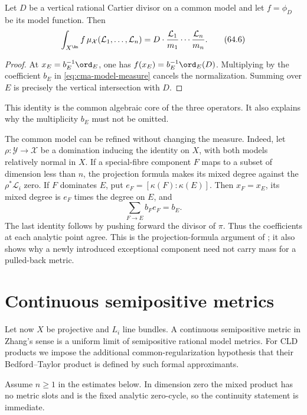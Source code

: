 \begin{proposition}\label{prop:cma-model-test}
Let $D$ be a vertical rational Cartier divisor on a common model and let
$f=\phi_D$ be its model function.
Then
\[
 \int_{X^{\An}}f\,
       \mu_{\mathcal X}(\mathcal L_1,\ldots,\mathcal L_n)
 =D\cdot\frac{\mathcal L_1}{m_1}\cdots
          \frac{\mathcal L_n}{m_n}.
\tag{64.6}\label{eq:cma-model-duality}
\]
\end{proposition}

\begin{proof}
At $x_E=b_E^{-1}\ord_E$, one has
$f(x_E)=b_E^{-1}\ord_E(D)$.
Multiplying by the coefficient $b_E$ in
\eqref{eq:cma-model-measure} cancels the normalization.
Summing over $E$ is precisely the vertical intersection with $D$.
\end{proof}

This identity is the common algebraic core of the three operators.
It also explains why the multiplicity $b_E$ must not be omitted.

The common model can be refined without changing the measure. Indeed, let $\rho\colon\mathcal Y\to\mathcal X$ be a domination inducing the identity on $X$, with both models relatively normal in $X$. If a special-fibre component $F$ maps to a subset of dimension less than $n$, the projection formula makes its mixed degree against the $\rho^*\mathcal L_i$ zero. If $F$ dominates $E$, put $e_F=[\kappa(F):\kappa(E)]$. Then $x_F=x_E$, its mixed degree is $e_F$ times the degree on $E$, and
\[
             \sum_{F\to E}b_Fe_F=b_E.
\tag{64.6a}\label{eq:cma-refinement-multiplicity}
\]
The last identity follows by pushing forward the divisor of $\pi$. Thus the coefficients at each analytic point agree. This is the projection-formula argument of ; it also shows why a newly introduced exceptional component need not carry mass for a pulled-back metric.

\section{Continuous semipositive metrics}
\label{sec:cma-continuous}

Let now $X$ be projective and $L_i$ line bundles.
A continuous semipositive metric in Zhang's sense is a uniform limit of
semipositive rational model metrics.
For CLD products we impose the additional common-regularization hypothesis
that their Bedford--Taylor product is defined by such formal approximants.

Assume $n\geq1$ in the estimates below. In dimension zero the mixed product has no metric slots and is the fixed analytic zero-cycle, so the continuity statement is immediate.

